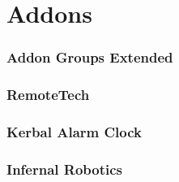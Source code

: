\part{Addons}
	\section{Addon Groups Extended}
	\section{RemoteTech}
	\section{Kerbal Alarm Clock}
	\section{Infernal Robotics}